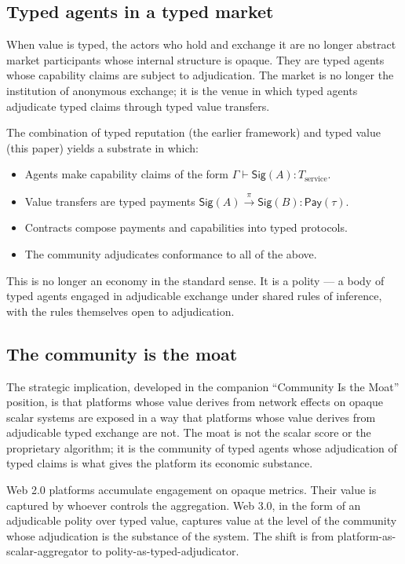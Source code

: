 \documentclass[11pt]{article}
\newcommand{\Sig}{\mathsf{Sig}}
\newcommand{\Pay}{\mathsf{Pay}}
\begin{document}
\subsection{Typed agents in a typed market}

When value is typed, the actors who hold and exchange it are no longer abstract market participants whose internal structure is opaque. They are typed agents whose capability claims are subject to adjudication. The market is no longer the institution of anonymous exchange; it is the venue in which typed agents adjudicate typed claims through typed value transfers.

The combination of typed reputation (the earlier framework) and typed value (this paper) yields a substrate in which:
\begin{itemize}[leftmargin=*]
\item Agents make capability claims of the form $\Gamma \vdash \Sig(A) : T_{\text{service}}$.
\item Value transfers are typed payments $\Sig(A) \xrightarrow{\pi} \Sig(B) : \Pay(\tau)$.
\item Contracts compose payments and capabilities into typed protocols.
\item The community adjudicates conformance to all of the above.
\end{itemize}

This is no longer an economy in the standard sense. It is a polity --- a body of typed agents engaged in adjudicable exchange under shared rules of inference, with the rules themselves open to adjudication.

\subsection{The community is the moat}

The strategic implication, developed in the companion ``Community Is the Moat'' position, is that platforms whose value derives from network effects on opaque scalar systems are exposed in a way that platforms whose value derives from adjudicable typed exchange are not. The moat is not the scalar score or the proprietary algorithm; it is the community of typed agents whose adjudication of typed claims is what gives the platform its economic substance.

Web 2.0 platforms accumulate engagement on opaque metrics. Their value is captured by whoever controls the aggregation. Web 3.0, in the form of an adjudicable polity over typed value, captures value at the level of the community whose adjudication is the substance of the system. The shift is from platform-as-scalar-aggregator to polity-as-typed-adjudicator.
\end{document}
